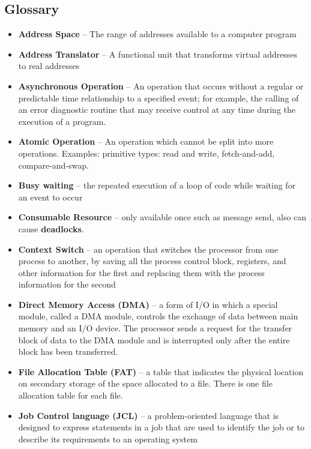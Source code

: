 \documentclass[fontsize=5pt]{scrartcl}
\begin{document}
\begin{multicols}{3}
  \section{Glossary}
    \begin{itemize}
      \item \textbf{Address Space} – The range of addresses available to a computer program
      \item \textbf{Address Translator} – A functional unit that transforms virtual addresses to real addresses
      \item \textbf{Asynchronous Operation} – An operation that occurs without a regular or predictable time relationship to a specified event; 
                              for example, the calling of an error diagnostic routine that may receive control at any time during the execution of a program.
      \item \textbf{Atomic Operation} – An operation which cannot be split into more operations. Examples: primitive types: read and write, fetch-and-add, compare-and-swap. 
      \item \textbf{Busy waiting} – the repeated execution of a loop of code while waiting for an event to occur
      \item \textbf{Consumable Resource} – only available once such as message send, also can cause \textbf{deadlocks}.
      \item \textbf{Context Switch} – an operation that switches the processor from one process to another, by saving all the process control block, registers, and other information for the first and 
                                      replacing them with the process information for the second
      \item \textbf{Direct Memory Access (DMA)} – a form of I/O in which a special module, called a DMA module, controls the exchange of data between main memory and an I/O device.  
                                  The processor sends a request for the transfer block of data to the DMA module and is interrupted only after the entire block has been transferred.
      \item \textbf{File Allocation Table (FAT)} – a table that indicates the physical location on secondary storage of the space allocated to a file.  There is one file allocation table for each file.
      \item \textbf{Job Control language (JCL)} – a problem-oriented language that is designed to express statements in a job that are used to identify the job or to describe its requirements to an operating system

\end{itemize}
\end{multicols}
\end{document}
